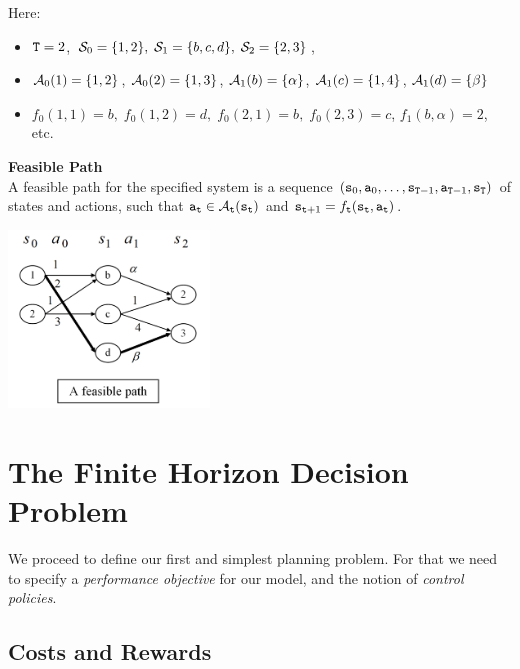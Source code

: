 Here:
\begin{itemize}
  \item ${\tt T} = 2$, ${\mathcal{S}_0} = \{ 1,2\} ,\;{\mathcal{S}_1} = \{ b,c,d\} ,\;{\mathcal{S}_2} = \{ 2,3\} $,
  \item ${\mathcal{A}_0}(1) = \{ 1,2\} $, ${\mathcal{A}_0}(2) = \{ 1,3\} $, ${\mathcal{A}_1}(b) = \{ \alpha \} $, ${\mathcal{A}_1}(c) = \{ 1,4\} $, ${\mathcal{A}_1}(d) = \{ \beta \} $
  \item ${f_0}(1,1) = b,\;{f_0}(1,2) = d,\;{f_0}(2,1) = b,\;{f_0}(2,3) = c$, ${f_1}(b,\alpha ) = 2$, etc.
\end{itemize}

\begin{definition}{\textbf{Feasible Path}} \\
A feasible path for the specified system is a sequence
$({{\tt s}_0},{{\tt a}_0}, \ldots ,{{\tt s}_{{\tt T} -
1}},{{\tt a}_{{\tt T} - 1}},{{\tt s}_{\tt T}})$ of states and
actions, such that ${{\tt a}_{{\tt t}}} \in
{\mathcal{A}_{{\tt t}}}({{\tt s}_{{\tt t}}})$ and ${{\tt s}_{{\tt t} + 1}} =
{f_{{\tt t}}}({{\tt s}_{{\tt t}}},{{\tt a}_{{\tt t}}})$.

\bigskip

\begin{centering}
\includegraphics[width=0.4\textwidth]{figures/lecture2_feasible_path}\\
\end{centering}
\end{definition}

\section{The Finite Horizon Decision Problem}

We proceed to define our first and simplest planning problem. For
that we need to specify a \emph{performance objective} for our
model, and the notion of \emph{control policies}.

\subsection{Costs and Rewards}

